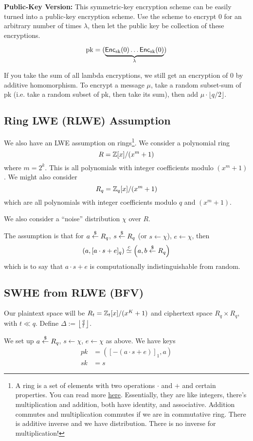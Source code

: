 \textbf{Public-Key Version:} This symmetric-key encryption scheme can be easily turned into a public-key encryption scheme. Use the scheme to encrypt 0 for an arbitrary number of times $\lambda$, then let the public key be collection of these encryptions.

$$\mathrm{pk} = (\underbrace{\operatorname{\mathsf{Enc}}_{\mathrm{sk}}(0) \dots \operatorname{\mathsf{Enc}}_{\mathrm{sk}}(0)}_{\lambda})$$

If you take the sum of all lambda encryptions, we still get an encryption of 0 by additive homomorphism. To encrypt a message $\mu$, take a random subset-sum of pk (i.e. take a random subset of pk, then take its sum), then add $\mu \cdot \lfloor q/ 2 \rfloor $.

\subsection{Ring LWE (RLWE) Assumption}
We also have an LWE assumption on rings\footnote{A ring is a set of elements with two operations $\cdot$ and $+$ and certain properties. You can read more \href{https://en.wikipedia.org/wiki/Ring_(mathematics)}{here}. Essentially, they are like integers, there's multiplication and addition, both have identity, and associative. Addition commutes and multiplication commutes if we are in commutative ring. There is additive inverse and we have distribution. There is no inverse for multiplication!}. We consider a polynomial ring
\[R = \mathbb Z[x]/(x^m + 1)\]
where $m = 2^k$. This is all polynomials with integer coefficients modulo $(x^m + 1)$. We might also consider
\[R_q = \mathbb Z_q[x] / (x^m + 1)\]
which are all polynomials with integer coefficients modulo $q$ and $(x^m + 1)$.

We also consider a ``noise'' distribution $\chi$ over $R$.

The assumption is that for $a\overset{\$}{\leftarrow} R_q$, $s\overset{\$}{\leftarrow} R_q$ (or $s\leftarrow \chi$), $e\leftarrow \chi$, then
\[\left( a, [a\cdot s + e]_q \right) \overset{c}{\simeq} \left( a, b\overset{\$}{\leftarrow} R_q \right)\]
which is to say that $a\cdot s + e$ is computationally indistinguishable from random.

\subsection{SWHE from RLWE (BFV)}
Our plaintext space will be $R_t = \mathbb Z_t[x]/(x^K + 1)$ and ciphertext space $R_q\times R_q$, with $t\ll q$. Define $\Delta := \left\lfloor \frac{q}{t}\right\rfloor$.

We set up $a\overset{\$}{\leftarrow} R_q$, $s\leftarrow \chi$, $e\leftarrow \chi$ as above. We have keys
\begin{align*}
    pk & = \left( [-(a\cdot s + e)]_1, a \right) \\
    sk & = s
\end{align*}

